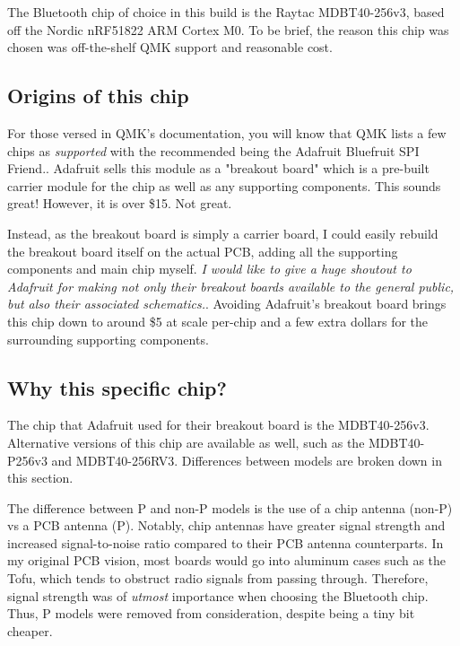 \documentclass[11pt]{article}
\begin{document}
The Bluetooth chip of choice in this build is the Raytac MDBT40-256v3,\footnotemark {} based off the Nordic nRF51822 ARM Cortex M0. To be brief, the reason this chip was chosen was off-the-shelf QMK support\footnotemark {} and reasonable cost. 

\subsection{Origins of this chip}

For those versed in QMK's documentation, you will know that QMK lists a few chips as \emph{supported} with the recommended being the Adafruit Bluefruit SPI Friend.\footnotemark {}. Adafruit sells this module as a "breakout board" which is a pre-built carrier module for the chip as well as any supporting components. This sounds great! However, it is over \$15. Not great.

Instead, as the breakout board is simply a carrier board, I could easily rebuild the breakout board itself on the actual PCB, adding all the supporting components and main chip myself. \emph{I would like to give a huge shoutout to Adafruit for making not only their breakout boards available to the general public, but also their associated schematics.}\footnotemark {}. Avoiding Adafruit's breakout board brings this chip down to around \$5 at scale per-chip and a few extra dollars for the surrounding supporting components. 


\subsection{Why this specific chip?}

The chip that Adafruit used for their breakout board is the MDBT40-256v3. Alternative versions of this chip are available as well, such as the MDBT40-P256v3 and MDBT40-256RV3. Differences between models are broken down in this section.

The difference between P and non-P models is the use of a chip antenna (non-P) vs a PCB antenna (P). Notably, chip antennas have greater signal strength and increased signal-to-noise ratio compared to their PCB antenna counterparts. In my original PCB vision, most boards would go into aluminum cases such as the Tofu, which tends to obstruct radio signals from passing through.\footnotemark {} Therefore, signal strength was of \emph{utmost} importance when choosing the Bluetooth chip. Thus, P models were removed from consideration, despite being a tiny bit cheaper.
\end{document}
